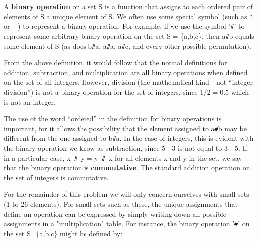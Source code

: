 
\newcommand{\op}{{\tt\#}}



\pagestyle{contest}


\maketitle


A {\bf binary operation} on a set S is a function that assigns to each
ordered pair of elements of S a unique element of S.  We often use
some special symbol (such as $*$ or $+$) to represent a binary
operation.  For example, if we use the symbol '\op' to represent some
arbitrary binary operation on the set S = \{a,b,c\}, then a{\op}b equals
some element of S (as does b{\op}a, a{\op}a, a{\op}c, and every other
possible permutation).

From the above definition, it would follow that the normal definitions
for addition, subtraction, and multiplication are all binary
operations when defined on the set of all integers.  However, division
(the mathematical kind - not ``integer division'') is not a binary
operation for the set of integers, since $1/2=0.5$ which is not
an integer.

The use of the word ``ordered'' in the definition for binary operations
is important, for it allows the possibility that the element assigned
to a{\op}b may be different from the one assigned to b{\op}a.  In the case
of integers, this is evident with the binary operation we know as
subtraction, since 5 - 3 is not equal to 3 - 5.  If in a particular
case, x~\op~y = y~\op~x for all elements x and y in the set, we say
that the binary operation is {\bf commutative}.  The standard addition
operation on the set of integers is commutative.

For the remainder of this problem we will only concern ourselves with
small sets (1 to 26 elements).  For small sets such as these, the
unique assignments that define an operation can be expressed by simply
writing down all possible assignments in a "multiplication" table.
For instance, the binary operation '\op' on the set S=\{a,b,c\} might be
defined by:

